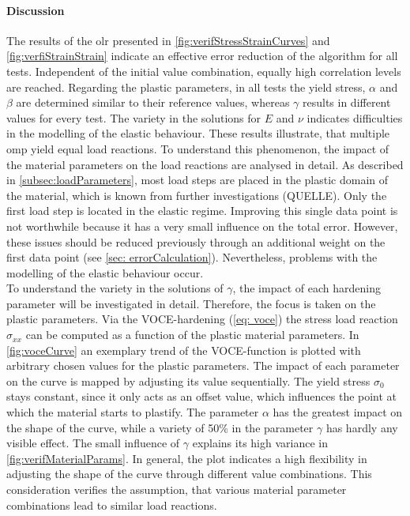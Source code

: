 \paragraph{Discussion}
The results of the \acrlong{olr} presented in \autoref{fig:verifStressStrainCurves} and \autoref{fig:verfiStrainStrain} indicate an effective error reduction of the algorithm for all tests. Independent of the initial value combination, equally high correlation levels are reached. Regarding the plastic parameters, in all tests the yield stress, $\alpha$ and $\beta$ are determined similar to their reference values, whereas $\gamma$ results in different values for every test.  
The variety in the solutions for $E$ and $\nu$ indicates difficulties in the modelling of the elastic behaviour. 
These results illustrate, that multiple \acrlong{omp} yield equal load reactions. To understand this phenomenon, the impact of the material parameters on the load reactions are analysed in detail.
As described in \autoref{subsec:loadParameters}, most load steps are placed in the plastic domain of the material, which is known from further investigations (QUELLE).
Only the first load step is located in the elastic regime.
Improving this single data point is not worthwhile because it has a very small influence on the total error.
However, these issues should be reduced previously through an additional weight on the first data point (see \autoref{sec: errorCalculation}).
Nevertheless, problems with the modelling of the elastic behaviour occur. \\
\indent To understand the variety in the solutions of $\gamma$, the impact of each hardening parameter will be investigated in detail.
Therefore, the focus is taken on the plastic parameters. Via the VOCE-hardening (\autoref{eq: voce}) the stress load reaction $\sigma_{xx}$ can be computed as a function of the plastic material parameters.
In \autoref{fig:voceCurve} an exemplary trend of the VOCE-function is plotted with arbitrary chosen values for the plastic parameters. The impact of each parameter on the curve is mapped by adjusting its value sequentially. The yield stress $\sigma_0$ stays constant, since it only acts as an offset value, which influences the point at which the material starts to plastify. The parameter $\alpha$ has the greatest impact on the shape of the curve, while a variety of 50\% in the parameter $\gamma$ has hardly any visible effect. The small influence of $\gamma$ explains its high variance in \autoref{fig:verifMaterialParams}. In general, the plot indicates a high flexibility in adjusting the shape of the curve through different value combinations. This consideration verifies the assumption, that various material parameter combinations lead to similar load reactions.

